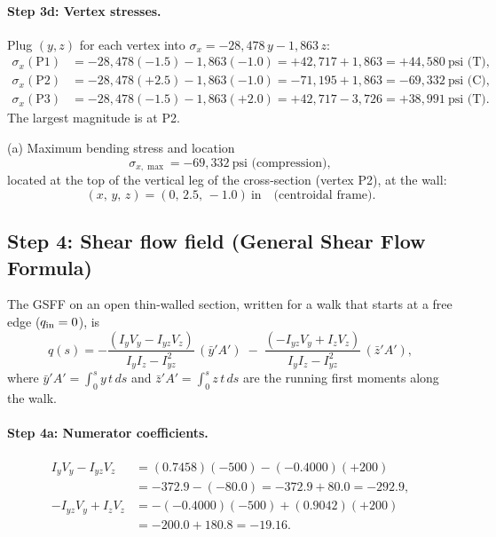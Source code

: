 \documentclass[11pt]{article}
\begin{document}
\paragraph{Step 3d: Vertex stresses.} Plug $(y,z)$ for each vertex into $\sigma_x = -28{,}478\,y - 1{,}863\,z$:
\begin{align*}
\sigma_x(\text{P1}) &= -28{,}478(-1.5) - 1{,}863(-1.0) = +42{,}717 + 1{,}863 = +44{,}580\ \text{psi (T)},\\
\sigma_x(\text{P2}) &= -28{,}478(+2.5) - 1{,}863(-1.0) = -71{,}195 + 1{,}863 = -69{,}332\ \text{psi (C)},\\
\sigma_x(\text{P3}) &= -28{,}478(-1.5) - 1{,}863(+2.0) = +42{,}717 - 3{,}726 = +38{,}991\ \text{psi (T)}.
\end{align*}
The largest magnitude is at P2.

\begin{answerbox}{(a) Maximum bending stress and location}
\[
\sigma_{x,\max} = -69{,}332\ \text{psi (compression)},
\]
located at the top of the vertical leg of the cross-section (vertex P2), at the wall:
\[
(x,\, y,\, z) = (0,\, 2.5,\, -1.0)\ \text{in}\quad\text{(centroidal frame).}
\]
\end{answerbox}

\subsection*{Step 4: Shear flow field (General Shear Flow Formula)}

The GSFF on an open thin-walled section, written for a walk that starts at a free edge ($q_{\rm in} = 0$), is
\[
q(s) = -\frac{(I_y V_y - I_{yz} V_z)}{I_y I_z - I_{yz}^2}\,(\bar y' A') \;-\; \frac{(-I_{yz} V_y + I_z V_z)}{I_y I_z - I_{yz}^2}\,(\bar z' A'),
\]
where $\bar y' A' = \int_0^s y\,t\,ds$ and $\bar z' A' = \int_0^s z\,t\,ds$ are the running first moments along the walk.

\paragraph{Step 4a: Numerator coefficients.}
\begin{align*}
I_y V_y - I_{yz} V_z &= (0.7458)(-500) - (-0.4000)(+200)\\
&= -372.9 - (-80.0) = -372.9 + 80.0 = -292.9,\\[2pt]
-I_{yz} V_y + I_z V_z &= -(-0.4000)(-500) + (0.9042)(+200)\\
&= -200.0 + 180.8 = -19.16.
\end{align*}
\end{document}
